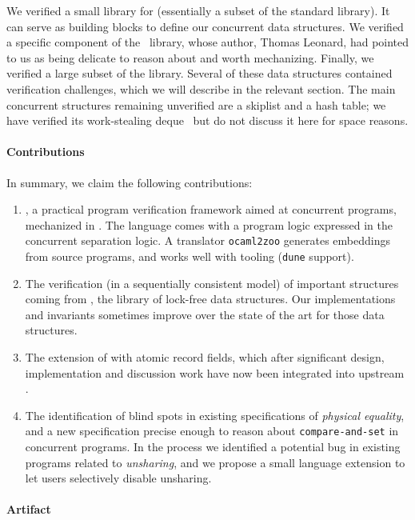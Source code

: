 We verified a small library for \ZooLang (essentially a subset of the \OCaml standard library).
It can serve as building blocks to define our concurrent data structures.
We verified a specific component of the \Eio~library, whose author, Thomas Leonard, had pointed to us as being delicate to reason about and worth mechanizing.
Finally, we verified a large subset of the \Saturn library.
Several of these data structures contained verification challenges, which we will describe in the relevant section.
The main \Saturn concurrent structures remaining unverified are a skiplist and a hash table; we have verified its work-stealing deque~\citep*{DBLP:conf/spaa/ChaseL05} but do not discuss it here for space reasons.

\paragraph{Contributions}

In summary, we claim the following contributions:
\begin{enumerate}
  \item
    \Zoo, a practical program verification framework aimed at concurrent \OCaml programs, mechanized in \Rocq.
    The language \ZooLang comes with a program logic expressed in the \Iris concurrent separation logic.
    A translator \texttt{ocaml2zoo} generates \Rocq embeddings from source \OCaml programs, and works well with \OCaml tooling (\texttt{dune} support).
  \item
    The verification (in a sequentially consistent model) of important structures coming from \Saturn, the \OCamlFive library of lock-free data structures.
    Our implementations and invariants sometimes improve over the \Iris state of the art for those data structures.
  \item
    The extension of \OCaml with atomic record fields, which after significant design, implementation and discussion work have now been integrated into upstream \OCaml.
  \item
    The identification of blind spots in existing specifications of \emph{physical equality}, and a new specification precise enough to reason about \texttt{compare-and-set} in concurrent programs.
    In the process we identified a potential bug in existing \OCaml programs related to \emph{unsharing}, and we propose a small language extension to let users selectively disable unsharing.
\end{enumerate}

\paragraph{Artifact}

